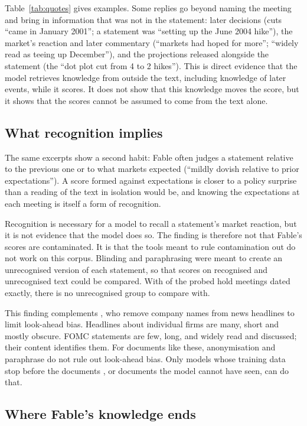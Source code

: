 Table~\ref{tab:quotes} gives examples. Some replies go beyond naming the meeting and bring in information
that was not in the statement: later decisions (cuts ``came in January 2001''; a statement was ``setting
up the June 2004 hike''), the market's reaction and later commentary (``markets had hoped for more'';
``widely read as teeing up December''), and the projections released alongside the statement (the
``dot plot cut from 4 to 2 hikes''). This is direct evidence that the model retrieves knowledge from
outside the text, including knowledge of later events, while it scores. It does not show that this knowledge moves
the score, but it shows that the scores cannot be assumed to come from the text alone.

\subsection{What recognition implies}

The same excerpts show a second habit: Fable often judges a statement relative to the previous one or
to what markets expected (``mildly dovish relative to prior expectations''). A score formed against
expectations is closer to a policy surprise than a reading of the text in isolation would be, and knowing
the expectations at each meeting is itself a form of recognition.

Recognition is necessary for a model to recall a statement's market reaction, but it is not evidence that
the model does so. The finding is therefore not that Fable's scores are contaminated. It is that the
tools meant to rule contamination out do not work on this corpus. Blinding and paraphrasing were meant to
create an unrecognised version of each statement, so that scores on recognised and unrecognised text
could be compared. With  of the  probed hold meetings dated exactly,
there is no unrecognised group to compare with.

This finding complements \citet{glasserman2023}, who remove company names from news headlines to limit
look-ahead bias. Headlines about individual firms are many, short and mostly obscure. FOMC statements are
few, long, and widely read and discussed; their content identifies them. For documents like these,
anonymisation and paraphrase do not rule out look-ahead bias. Only models whose training data stop before the documents
\citep{he2025,drinkall2024}, or documents the model cannot have seen, can do that.

\subsection{Where Fable's knowledge ends}\label{sec:cutoff}

